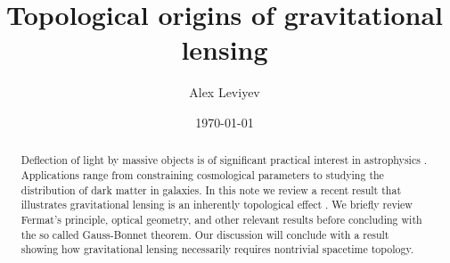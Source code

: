 \documentclass{article}
\theoremstyle{definition}
\theoremstyle{plain}
\theoremstyle{remark}
\begin{document}
\title{Topological origins of gravitational lensing}
\author[1]{Alex Leviyev}
\date{\today}
\maketitle

\begin{abstract}
Deflection of light by massive objects is of significant practical interest in astrophysics \cite{congdon2018principles}. Applications range from constraining cosmological parameters to studying the distribution of dark matter in galaxies. In this note we review a recent result that illustrates gravitational lensing is an inherently topological effect \cite{Gibbons_2008}. We briefly review Fermat's principle, optical geometry, and other relevant results before concluding with the so called Gauss-Bonnet theorem. Our discussion will conclude with a result showing how gravitational lensing necessarily requires nontrivial spacetime topology.
\end{abstract}

% 
% 
% 



\end{document}
